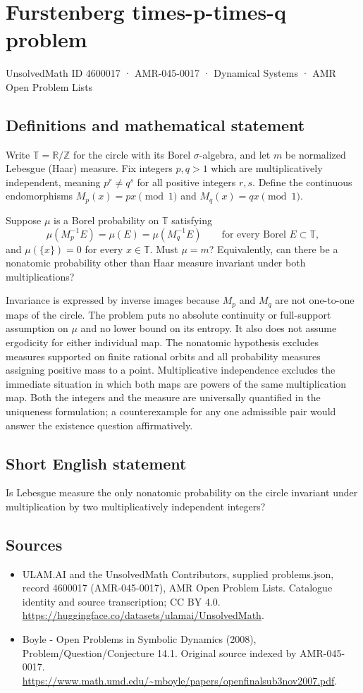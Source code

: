 \documentclass[11pt,a4paper]{article}
\begin{document}
\section*{Furstenberg times-p-times-q problem}\label{4600017}
{\small UnsolvedMath ID 4600017 · AMR-045-0017 · Dynamical Systems · AMR Open Problem Lists}
\subsection{Definitions and mathematical statement}
Write $\mathbb T=\mathbb R/\mathbb Z$ for the circle with its Borel
$\sigma$-algebra, and let $m$ be normalized Lebesgue (Haar) measure.
Fix integers $p,q>1$ which are multiplicatively independent, meaning
$p^r\ne q^s$ for all positive integers $r,s$. Define the continuous
endomorphisms $M_p(x)=px\pmod1$ and $M_q(x)=qx\pmod1$.

Suppose $\mu$ is a Borel probability on $\mathbb T$ satisfying
\[
 \mu(M_p^{-1}E)=\mu(E)=\mu(M_q^{-1}E)
 \qquad\text{for every Borel }E\subset\mathbb T,
\]
and $\mu(\{x\})=0$ for every $x\in\mathbb T$.
Must $\mu=m$? Equivalently, can there be a nonatomic probability other
than Haar measure invariant under both multiplications?

Invariance is expressed by inverse images because $M_p$ and $M_q$ are
not one-to-one maps of the circle. The problem puts no absolute continuity
or full-support assumption on $\mu$ and no lower bound on its entropy.
It also does not assume ergodicity for either individual map. The
nonatomic hypothesis excludes measures supported on finite rational
orbits and all probability measures assigning positive mass to a point.
Multiplicative independence excludes the immediate situation in which
both maps are powers of the same multiplication map. Both the integers
and the measure are universally quantified in the uniqueness formulation;
a counterexample for any one admissible pair would answer the existence
question affirmatively.
\subsection{Short English statement}
Is Lebesgue measure the only nonatomic probability on the circle invariant under multiplication by two multiplicatively independent integers?
\subsection{Sources}
\begin{itemize}
\item[S1] ULAM.AI and the UnsolvedMath Contributors, supplied problems.json, record 4600017 (AMR-045-0017), AMR Open Problem Lists. Catalogue identity and source transcription; CC BY 4.0.
\url{https://huggingface.co/datasets/ulamai/UnsolvedMath}.
\item[S2] Boyle - Open Problems in Symbolic Dynamics (2008), Problem/Question/Conjecture 14.1. Original source indexed by AMR-045-0017.
\url{https://www.math.umd.edu/~mboyle/papers/openfinalsub3nov2007.pdf}.
\end{itemize}
\end{document}
